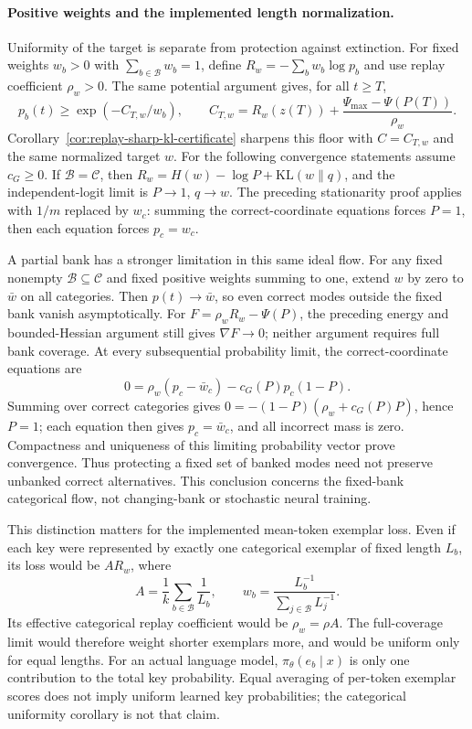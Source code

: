 \documentclass{article}
\newcommand{\1}{\mathbf 1}
\theoremstyle{remark}
\theoremstyle{definition}
\theoremstyle{plain}
\begin{document}
\paragraph{Positive weights and the implemented length normalization.}
Uniformity of the target is separate from protection against extinction.
For fixed weights $w_b>0$ with $\sum_{b\in\mathcal B}w_b=1$, define
$R_w=-\sum_b w_b\log p_b$ and use replay coefficient $\rho_w>0$.
The same potential argument gives, for all $t\ge T$,
\[
 p_b(t)\ge\exp(-C_{T,w}/w_b),\qquad
 C_{T,w}=R_w(z(T))+\frac{\Psi_{\max}-\Psi(P(T))}{\rho_w}.
\]
Corollary~\ref{cor:replay-sharp-kl-certificate} sharpens this floor with
$C=C_{T,w}$ and the same normalized target $w$.
For the following convergence statements assume $c_G\ge0$.
If $\mathcal B=\mathcal C$, then
$R_w=H(w)-\log P+\mathrm{KL}(w\|q)$, and the independent-logit limit is
$P\to1$, $q\to w$. The preceding stationarity proof applies with $1/m$
replaced by $w_c$: summing the correct-coordinate equations forces $P=1$,
then each equation forces $p_c=w_c$.

A partial bank has a stronger limitation in this same ideal flow. For any
fixed nonempty $\mathcal B\subseteq\mathcal C$ and fixed positive weights
summing to one, extend $w$ by zero to $\bar w$ on all categories. Then
$p(t)\to\bar w$, so even correct modes outside the fixed bank vanish
asymptotically. For $F=\rho_wR_w-\Psi(P)$, the preceding energy and
bounded-Hessian argument still gives $\nabla F\to0$; neither argument
requires full bank coverage.
At every subsequential probability limit, the correct-coordinate equations are
\[
 0=\rho_w(p_c-\bar w_c)-c_G(P)p_c(1-P).
\]
Summing over correct categories gives
$0=-(1-P)(\rho_w+c_G(P)P)$, hence $P=1$; each equation then gives
$p_c=\bar w_c$, and all incorrect mass is zero. Compactness and uniqueness
of this limiting probability vector prove convergence. Thus protecting a
fixed set of banked modes need not preserve unbanked correct alternatives.
This conclusion concerns the fixed-bank categorical flow, not changing-bank
or stochastic neural training.

This distinction matters for the implemented mean-token exemplar loss.
Even if each key were represented by exactly one categorical exemplar of
fixed length $L_b$, its loss would be $A R_w$, where
\[
 A=\frac1k\sum_{b\in\mathcal B}\frac1{L_b},\qquad
 w_b=\frac{L_b^{-1}}{\sum_{j\in\mathcal B}L_j^{-1}}.
\]
Its effective categorical replay coefficient would be $\rho_w=\rho A$.
The full-coverage limit would therefore weight shorter exemplars more, and
would be uniform only for equal lengths. For an actual language model,
$\pi_\theta(e_b\mid x)$ is only one contribution to the total key probability.
Equal averaging of per-token exemplar scores does not imply uniform learned
key probabilities; the categorical uniformity corollary is not that claim.
\end{document}
